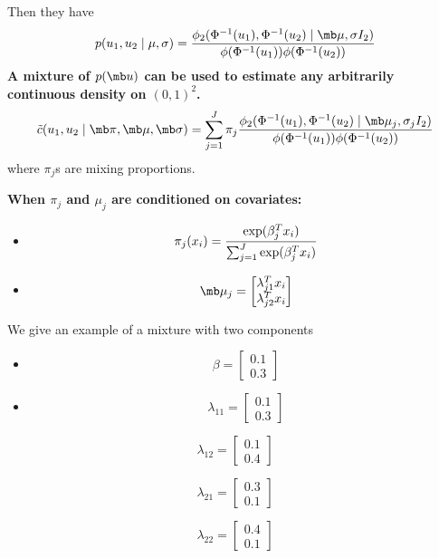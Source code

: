 \documentclass[]{article}
\begin{document}
Then they have \[
p(u_1,u_2 \mid \mu, \sigma)=\frac{\phi_2(\Phi^{-1}(u_1), \Phi^{-1}(u_2)  \mid\mb\mu, \sigma I_2)}{\phi(\Phi^{-1}(u_1))\phi(\Phi^{-1}(u_2))}
\] \textbf{A mixture of \(p(\mb u)\) can be used to estimate any
arbitrarily continuous density on \((0,1)^2\).} \[
\tilde{c}(u_1,u_2 \mid \mb \pi, \mb \mu, \mb \sigma) =\sum^J_{j=1} \pi_j \frac{\phi_2(\Phi^{-1}(u_1),\Phi^{-1}(u_2)  \mid \mb\mu_j, \sigma_j I_2)}{\phi(\Phi^{-1}(u_1))\phi(\Phi^{-1}(u_2))}
\] where \(\pi_j\)s are mixing proportions.

\textbf{When \(\pi_j\) and \(\mu_j\) are conditioned on covariates:}

\begin{itemize}
\item
  \[
    \pi_j(x_i)=\frac{\exp(\beta_j^T x_i)}{\sum^J_{j=1} \exp(\beta_j^Tx_i)}\\
    \]
\item
  \[
    \mb\mu_{j}=
    \begin{bmatrix}
    \lambda_{j1}^Tx_i \\
    \lambda_{j2}^Tx_i 
    \end{bmatrix}
    \]
\end{itemize}

We give an example of a mixture with two components

\begin{itemize}
\item
  \[
    \beta=
    \begin{bmatrix}
    0.1 \\
    0.3
    \end{bmatrix}
    \]
\item
  \[
    \lambda_{11}=
    \begin{bmatrix}
    0.1 \\
    0.3
    \end{bmatrix}
   \]
\end{itemize}

\[
  \lambda_{12}=
  \begin{bmatrix}
  0.1 \\
  0.4
  \end{bmatrix}
  \]

\[
  \lambda_{21}=
  \begin{bmatrix}
  0.3\\
  0.1 
  \end{bmatrix}
  \]

\[
  \lambda_{22}=
  \begin{bmatrix}
  0.4\\
  0.1 
  \end{bmatrix}
  \]
\end{document}
